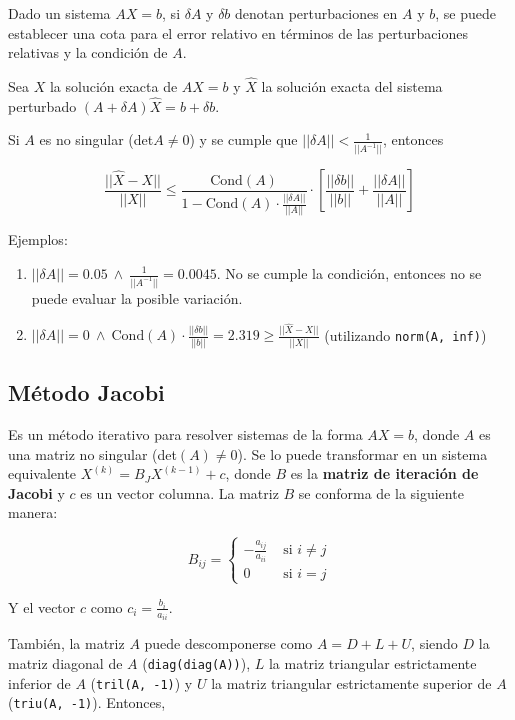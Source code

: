 \documentclass{article}
\begin{document}
Dado un sistema $AX=b$, si $\delta A$ y $\delta b$ denotan perturbaciones en $A$ y $b$, se puede establecer una cota para el error relativo en términos de las perturbaciones relativas y la condición de $A$.

Sea $X$ la solución exacta de $AX=b$ y $\hat{X}$ la solución exacta del sistema perturbado $(A+\delta A)\hat{X} = b + \delta b$.

Si $A$ es no singular (det$A\neq0$) y se cumple que $||\delta A|| < \frac{1}{||A^{-1}||}$, entonces

\begin{equation}
    \frac{||\hat{X}-X||}{||X||} \leq \frac{\text{Cond}(A)}{1-\text{Cond}(A)\cdot\frac{||\delta A||}{||A||}}\cdot\left[ \frac{||\delta b||}{||b||} + \frac{||\delta A||}{||A||} \right]
\end{equation}

Ejemplos:
\begin{enumerate}
    \item $||\delta A|| = 0.05\ \land\ \frac{1}{||A^{-1}||}=0.0045$. No se cumple la condición, entonces no se puede evaluar la posible variación.
    \item $||\delta A|| = 0\ \land\ \text{Cond}(A)\cdot\frac{||\delta b||}{||b||} = 2.319 \geq \frac{||\hat{X}-X||}{||X||}$ (utilizando \verb|norm(A, inf)|)
\end{enumerate}

\subsection{Método Jacobi}

Es un método iterativo para resolver sistemas de la forma $AX=b$, donde $A$ es una matriz no singular (det$(A)\neq0$). Se lo puede transformar en un sistema equivalente $X^{(k)}=B_JX^{(k-1)}+c$, donde $B$ es la \textbf{matriz de iteración de Jacobi} y $c$ es un vector columna. La matriz $B$ se conforma de la siguiente manera:

\begin{equation} \label{eq:jacobi}
    B_{ij} = 
    \begin{cases}
        -\frac{a_{ij}}{a_{ii}} &\text{ si } i\neq j \\
        0 &\text{ si } i=j
    \end{cases}
\end{equation}

Y el vector $c$ como $c_i = \frac{b_i}{a_{ii}}$.

También, la matriz $A$ puede descomponerse como $A=D+L+U$, siendo $D$ la matriz diagonal de $A$ (\verb|diag(diag(A))|), $L$ la matriz triangular estrictamente inferior de $A$ (\verb|tril(A, -1)|) y $U$ la matriz triangular estrictamente superior de $A$ (\verb|triu(A, -1)|). Entonces,
\end{document}
